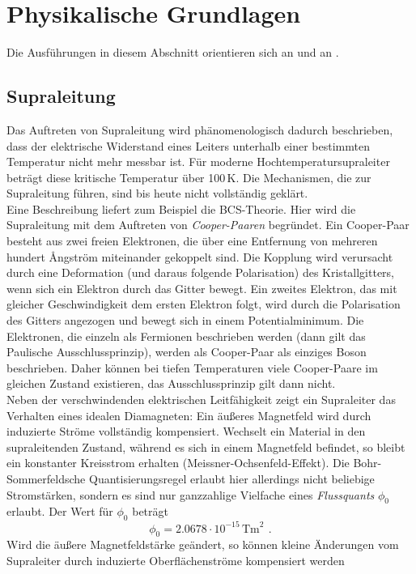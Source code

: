 \section{Physikalische Grundlagen}
Die Ausführungen in diesem Abschnitt orientieren sich an \cite{manual} und an \cite{staatsex}.
\subsection{Supraleitung}
Das Auftreten von Supraleitung wird phänomenologisch dadurch beschrieben,
dass der elektrische Widerstand eines Leiters unterhalb einer bestimmten Temperatur nicht mehr
messbar ist. Für moderne Hochtemperatursupraleiter beträgt diese kritische Temperatur über 100\,K.
Die Mechanismen, die zur Supraleitung führen, sind bis heute nicht vollständig geklärt.\\
Eine Beschreibung liefert zum Beispiel die BCS-Theorie.
Hier wird die Supraleitung mit dem Auftreten von \emph{Cooper-Paaren} begründet.
Ein Cooper-Paar besteht aus zwei freien Elektronen, die über eine Entfernung von mehreren hundert Ångström
miteinander gekoppelt sind.
Die Kopplung wird verursacht durch eine Deformation (und daraus folgende Polarisation) des Kristallgitters,
wenn sich ein Elektron durch das Gitter bewegt. Ein zweites Elektron, das mit gleicher Geschwindigkeit
dem ersten Elektron folgt, wird durch die Polarisation des Gitters angezogen und bewegt sich
in einem Potentialminimum.
Die Elektronen, die einzeln als Fermionen beschrieben werden (dann gilt das Paulische Ausschlussprinzip),
werden als Cooper-Paar als einziges Boson beschrieben.
Daher können bei tiefen Temperaturen viele Cooper-Paare im gleichen Zustand existieren,
das Ausschlussprinzip gilt dann nicht.\\
Neben der verschwindenden elektrischen Leitfähigkeit zeigt ein Supraleiter das Verhalten eines idealen Diamagneten:
Ein äußeres Magnetfeld wird durch induzierte Ströme vollständig kompensiert.
Wechselt ein Material in den supraleitenden Zustand, während es sich in einem Magnetfeld befindet,
so bleibt ein konstanter Kreisstrom erhalten (Meissner-Ochsenfeld-Effekt).
Die Bohr-Sommerfeldsche Quantisierungsregel erlaubt hier allerdings nicht beliebige Stromstärken,
sondern es sind nur ganzzahlige Vielfache eines \emph{Flussquants} $\phi_0$ erlaubt.
Der Wert für $\phi_0$ beträgt
\begin{equation}
\phi_0 = 2.0678 \cdot 10^{-15}\,\text{Tm}^2 \ \, .
\end{equation}
Wird die äußere Magnetfeldstärke geändert,
so können kleine Änderungen vom Supraleiter durch induzierte Oberflächenströme kompensiert werden
